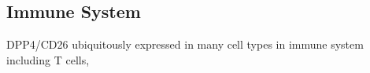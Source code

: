 \subsection{Immune System}
DPP4/CD26 ubiquitously expressed in many cell types in immune system including T cells, 